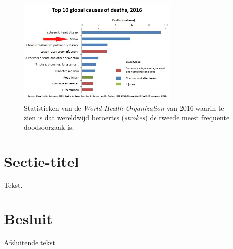 \documentclass[a4paper,kulak]{kulakarticle}
\begin{document}
	\begin{figure}[H]
		\centering
		\includegraphics[width = 0.7\textwidth]{top10doodsoorzaken.png}
	
		\caption{Statistieken van de \textit{World Health Organization} van 2016 waarin te zien is dat wereldwijd beroertes (\textit{strokes}) de tweede meest frequente doodsoorzaak is.}
		\label{figuur doodsoorzaken}
	\end{figure}

\pagebreak


\section{Sectie-titel}

Tekst.

\section*{Besluit}

Afsluitende tekst


\end{document}
